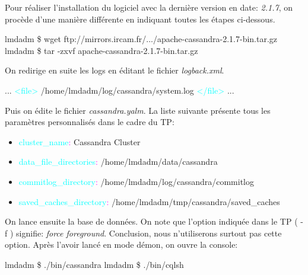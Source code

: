 \par Pour réaliser l'installation du logiciel avec la dernière version en date: \textit{2.1.7},\newline
on procède d'une manière différente en indiquant toutes les étapes ci-dessous.\newline
\begin{tt}
lmdadm \$ wget ftp://mirrors.ircam.fr/.../apache-cassandra-2.1.7-bin.tar.gz \newline
lmdadm \$ tar -zxvf apache-cassandra-2.1.7-bin.tar.gz \newline
\end{tt}
On redirige en suite les logs en éditant le fichier \textit{logback.xml}. \newline
\begin{tt}
... \newline
\textcolor{cyan}{<file>} /home/lmdadm/log/cassandra/system.log \textcolor{cyan}{</file>} \newline
... \newline
\end{tt}
Puis on édite le fichier \textit{cassandra.yalm}. La liste suivante présente tous les paramètres personnalisés dans le cadre du TP:
\begin{itemize}
\item \textcolor{cyan}{cluster\_name}\textcolor{magenta}{:} Cassandra Cluster
\item \textcolor{cyan}{data\_file\_directories}\textcolor{magenta}{:} /home/lmdadm/data/cassandra
\item \textcolor{cyan}{commitlog\_directory}\textcolor{magenta}{:} /home/lmdadm/log/cassandra/commitlog
\item \textcolor{cyan}{saved\_caches\_directory}\textcolor{magenta}{:} /home/lmdadm/tmp/cassandra/saved\_caches
\end{itemize}
On lance ensuite la base de données. On note que l'option indiquée dans le TP ( -f )
signifie: \textit{force foreground}. Conclusion, nous n'utiliserons surtout pas cette option. Après l'avoir lancé en mode démon, on ouvre la console: \newline
\begin{tt}
lmdadm \$ ./bin/cassandra \newline
lmdadm \$ ./bin/cqlsh \newline
\end{tt}
